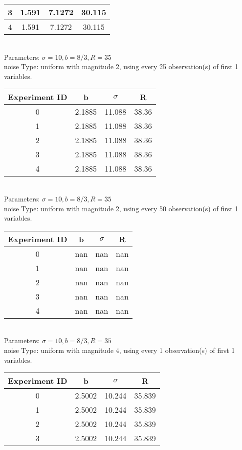 \begin{multicols}{3}
\begin{tabular}{cccc}
 3 & 1.591 & 7.1272 & 30.115\\ \hline 
 4 & 1.591 & 7.1272 & 30.115\\ \hline 
 \end{tabular}\\
Parameters: $\sigma=10, b=8/3, R=35$\\
noise Type: uniform with magnitude 2, using every 25 observation(s) of first 1 variables.\\
\begin{tabular}{cccc}
\hline Experiment ID & b & $\sigma$ & R \\ \hline 
0 & 2.1885 & 11.088 & 38.36\\ \hline 
 1 & 2.1885 & 11.088 & 38.36\\ \hline 
 2 & 2.1885 & 11.088 & 38.36\\ \hline 
 3 & 2.1885 & 11.088 & 38.36\\ \hline 
 4 & 2.1885 & 11.088 & 38.36\\ \hline 
 \end{tabular}\\
Parameters: $\sigma=10, b=8/3, R=35$\\
noise Type: uniform with magnitude 2, using every 50 observation(s) of first 1 variables.\\
\begin{tabular}{cccc}
\hline Experiment ID & b & $\sigma$ & R \\ \hline 
0 & nan & nan & nan\\ \hline 
 1 & nan & nan & nan\\ \hline 
 2 & nan & nan & nan\\ \hline 
 3 & nan & nan & nan\\ \hline 
 4 & nan & nan & nan\\ \hline 
 \end{tabular}\\
Parameters: $\sigma=10, b=8/3, R=35$\\
noise Type: uniform with magnitude 4, using every 1 observation(s) of first 1 variables.\\
\begin{tabular}{cccc}
\hline Experiment ID & b & $\sigma$ & R \\ \hline 
0 & 2.5002 & 10.244 & 35.839\\ \hline 
 1 & 2.5002 & 10.244 & 35.839\\ \hline 
 2 & 2.5002 & 10.244 & 35.839\\ \hline 
 3 & 2.5002 & 10.244 & 35.839\\ \hline 

\end{tabular}
\end{multicols}
